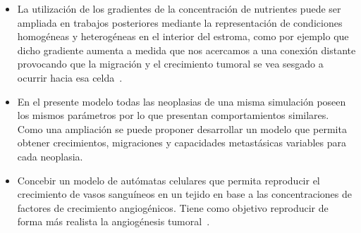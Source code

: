 \begin{itemize}
\item La utilizaci\'on de los gradientes de la concentraci\'on de nutrientes puede ser ampliada en trabajos posteriores mediante la representaci\'on de condiciones homog\'eneas y heterog\'eneas en el interior del estroma, como por ejemplo que dicho gradiente aumenta a medida que nos acercamos a una conexi\'on distante provocando que la migraci\'on y el crecimiento tumoral se vea sesgado a ocurrir hacia esa celda~\cite{anderson,kansal3,vascular,chaplain}.

\item En el presente modelo todas las neoplasias de una misma simulaci\'on poseen los mismos par\'ametros por lo que presentan comportamientos similares. Como una ampliaci\'on se puede proponer desarrollar un modelo que permita obtener crecimientos, migraciones y capacidades metast\'asicas variables para cada neoplasia. 

\item Concebir un modelo de aut\'omatas celulares que permita reproducir el crecimiento de vasos sangu\'ineos en un tejido en base a las concentraciones de factores de crecimiento angiog\'enicos. Tiene como objetivo reproducir de forma m\'as realista la angiog\'enesis tumoral~\cite{book,vascular,angiogenesis}.
\end{itemize} 